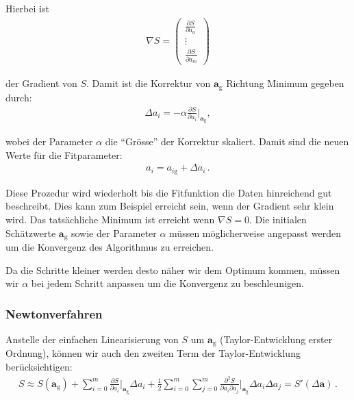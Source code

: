 Hierbei ist
\begin{align}
\nabla S =
\begin{pmatrix}
\frac{\partial S}{\partial a_0} \\
\vdots \\
\frac{\partial S}{\partial a_m}
\end{pmatrix}
\label{eq:vl9-4}
\end{align}

der Gradient von $S$. Damit ist die Korrektur von $\boldsymbol{a}_\mathrm{g}$ Richtung Minimum gegeben durch:
\begin{align}
\Delta a_i = - \alpha \frac{ \partial S }{ \partial a_i } \bigg|_{\boldsymbol{a}_\mathrm{g}},
\label{eq:vl9-5}
\end{align}

wobei der Parameter $\alpha$ die ``Gr\"osse'' der Korrektur skaliert. Damit sind die neuen Werte f\"ur die Fitparameter:
\begin{align}
a_i = a_{i\mathrm{g}} + \Delta a_i\,.
\label{eq:vl9-6}
\end{align}

Diese Prozedur wird wiederholt bis die Fitfunktion die Daten hinreichend gut beschreibt. Dies kann zum Beispiel erreicht sein, wenn der Gradient sehr klein wird. Das tats\"achliche Minimum ist erreicht wenn $\nabla S = 0$. Die initialen Sch\"atzwerte $\boldsymbol{a}_\mathrm{g}$ sowie der Parameter $\alpha$ m\"ussen m\"oglicherweise angepasst werden um die Konvergenz des Algorithmus zu erreichen.


\begin{center}
\begin{tcolorbox}[enhanced,width=6in,drop fuzzy shadow southwest,
    colframe=red!50!black,colback=red!05]
   Da die Schritte kleiner werden desto n\"aher wir dem Optimum kommen, m\"ussen wir $\alpha$ bei jedem Schritt anpassen um die Konvergenz zu beschleunigen.
\end{tcolorbox}
\end{center}

\subsubsection{Newtonverfahren}
\label{subsubsec:vl9-2}

Anstelle der einfachen Linearisierung von $S$ um $\boldsymbol{a}_\mathrm{g}$ (Taylor-Entwicklung erster Ordnung), k\"onnen wir auch den zweiten Term der Taylor-Entwicklung ber\"ucksichtigen:
\begin{align}
S \approx S(\boldsymbol{a}_\mathrm{g}) + \sum_{i=0}^m \frac{ \partial S }{ \partial a_i } \bigg|_{\boldsymbol{a}_\mathrm{g}} \Delta a_i + \frac{1}{2} \sum_{i=0}^m \sum_{j=0}^m \frac{ \partial^2 S }{ \partial a_i \partial a_j } \bigg|_{\boldsymbol{a}_\mathrm{g}} \Delta a_i \Delta a_j = S'(\Delta \boldsymbol{a}) \,.
\label{eq:vl9-7}
\end{align}

